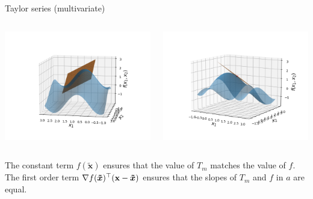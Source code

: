 \begin{vbframe}{Taylor series (multivariate)}
    \begin{columns}
    \begin{column}{0.48\textwidth}
      \includegraphics[width = \textwidth]{figure_man/Taylor2D/Taylor2D_1st100.png}
    \end{column}
    \begin{column}{0.48\textwidth}
      \includegraphics[width = \textwidth]{figure_man/Taylor2D/Taylor2D_1st301.png}
    \end{column}
  \end{columns}

    The constant term $f(\bm{\tilde{x}})$ ensures that the value of $T_{m}$ matches the value of $f$. \newline
    The first order term  $\nabla f(\bm{\tilde{x}})^\top(\mathbf{x}-\bm{\tilde{x}})$ ensures that the slopes of $T_{m}$ and $f$ in $a$ are equal.
    

\end{vbframe}
